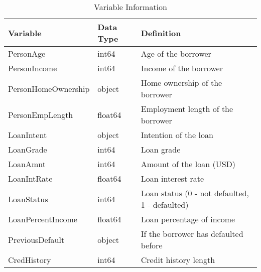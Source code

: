 \begin{table}[H]\centering
\caption{Variable Information}
\label{Table 1:variable_info}
\begin{tabular}{lll}
\toprule
Variable & Data Type & Definition \\
\midrule
PersonAge & int64 & Age of the borrower \\
PersonIncome & int64 & Income of the borrower \\
PersonHomeOwnership & object & Home ownership of the borrower \\
PersonEmpLength & float64 & Employment length of the borrower \\
LoanIntent & object & Intention of the loan \\
LoanGrade & int64 & Loan grade \\
LoanAmnt & int64 & Amount of the loan (USD) \\
LoanIntRate & float64 & Loan interest rate \\
LoanStatus & int64 & Loan status (0 - not defaulted, 1 - defaulted) \\
LoanPercentIncome & float64 & Loan percentage of income \\
PreviousDefault & object & If the borrower has defaulted before \\
CredHistory & int64 & Credit history length \\
\bottomrule
\end{tabular}
\end{table}
